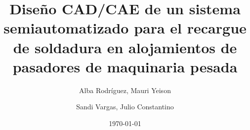 \documentclass[12pt,a4paper]{article}
\title{\textbf{Diseño CAD/CAE de un sistema semiautomatizado para el recargue de soldadura en alojamientos de pasadores de maquinaria pesada}}
\author{Alba Rodríguez, Mauri Yeison \and Sandi Vargas, Julio Constantino}
\date{\today}
\begin{document}
\maketitle


\newpage
\tableofcontents
\newpage

















\newpage
\renewcommand{\refname}{Referencias}


\end{document}

